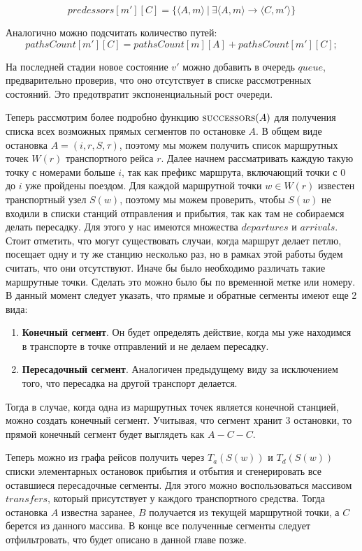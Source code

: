 \[
predessors[m'][C]=\{\langle A, m\rangle\ |\ \exists \langle A, m \rangle \rightarrow \langle C, m' \rangle\}
\]

Аналогично можно подсчитать количество путей:
\[
pathsCount[m'][C] = pathsCount[m][A] + pathsCount[m'][C];
\]

На последней стадии новое состояние $v'$ можно добавить в очередь $queue$, предварительно проверив, что оно отсутствует в списке рассмотренных состояний. Это предотвратит экспоненциальный рост очереди.

Теперь рассмотрим более подробно функцию $\Call{successors}{A}$ для получения списка всех возможных прямых сегментов по остановке $A$. В общем виде остановка $A=(i, r, S, \tau)$, поэтому мы можем получить список маршрутных точек $W(r)$ транспортного рейса $r$. Далее начнем рассматривать каждую такую точку с номерами больше $i$, так как префикс маршрута, включающий точки с $0$ до $i$ уже пройдены поездом. Для каждой маршрутной точки $w \in W(r)$ известен транспортный узел $S(w)$, поэтому мы можем проверить, чтобы $S(w)$ не входили в списки станций отправления и прибытия, так как там не собираемся делать пересадку. Для этого у нас имеются множества $departures$ и $arrivals$. Стоит отметить, что могут существовать случаи, когда маршрут делает петлю, посещает одну и ту же станцию несколько раз, но в рамках этой работы будем считать, что они отсутствуют. Иначе бы было необходимо различать такие маршрутные точки. Сделать это можно было бы по временной метке или номеру. В данный момент следует указать, что прямые и обратные сегменты имеют еще 2 вида:
\begin{enumerate}
	\item \textbf{Конечный сегмент}. Он будет определять действие, когда мы уже находимся в транспорте в точке отправлений и не делаем пересадку.
	\item \textbf{Пересадочный сегмент}. Аналогичен предыдущему виду за исключением того, что пересадка на другой транспорт делается.
\end{enumerate}

Тогда в случае, когда одна из маршрутных точек является конечной станцией, можно создать конечный сегмент. Учитывая, что сегмент хранит 3 остановки, то прямой конечный сегмент будет выглядеть как $A-C-C$.

Теперь можно из графа рейсов получить через $T_a(S(w))$ и $T_d(S(w))$ списки элементарных остановок прибытия и отбытия и сгенерировать все оставшиеся пересадочные сегменты. Для этого можно воспользоваться массивом $transfers$, который присутствует у каждого транспортного средства. Тогда остановка $A$ известна заранее, $B$ получается из текущей маршрутной точки, а $C$ берется из данного массива. В конце все полученные сегменты следует отфильтровать, что будет описано в данной главе позже.

